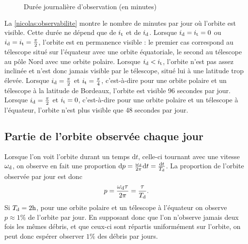 \begin{figure}
\scriptsize
\begin{center}
\def\svgwidth{0.5\linewidth}
 
 \vspace*{-2em}
\caption{Durée journalière d'observation (en minutes)} \label{nicolas:observabilite}
\end{center}
\end{figure}%

La \autoref{nicolas:observabilite} montre le nombre de minutes par jour où l'orbite est visible. Cette durée ne dépend que de $i_\text{t}$ et de $i_\text{d}$. Lorsque $i_\text{d}=i_\text{t}=0$ ou $i_\text{d}=i_\text{t}=\frac{\pi}{2}$, l'orbite est en permanence visible : le premier cas correspond au télescope situé sur l'équateur avec une orbite équatoriale, le second au télescope au pôle Nord avec une orbite polaire. Lorsque $i_\text{d} < i_\text{t}$, l'orbite n'est pas assez inclinée et n'est donc jamais visible par le télescope, situé lui à une latitude trop élevée. Lorsque $i_\text{d} = \frac{\pi}{2}$ et $i_\text{t} = \frac{\pi}{4}$, c'est-à-dire pour une orbite polaire et un télescope à la latitude de Bordeaux, l'orbite est visible 96 secondes par jour. Lorsque $i_\text{d} = \frac{\pi}{2}$ et $i_\text{t} = 0$, c'est-à-dire pour une orbite polaire et un télescope à l'équateur, l'orbite n'est plus visible que 48 secondes par jour. 


\subsection{Partie de l'orbite observée chaque jour}

Lorsque l'on voit l'orbite durant un temps $\mathrm{d}t$, celle-ci tournant avec une vitesse $\omega_\text{d}$, on observe en fait une proportion $\mathrm{d}p = \frac{\omega_\text{d}}{2\pi} \mathrm{d} t = \frac{\mathrm{d}t}{T_\text{d}}$. La proportion de l'orbite observée par jour est donc
\[ p = \frac{\omega_\text{d} \tau}{2\pi} = \frac{\tau}{T_\text{d}}.\]
Si $T_\text{d} = 2 \text{h}$, pour une orbite polaire et un télescope à l'équateur on observe $p \approx 1 \%$ de l'orbite par jour. En supposant donc que l'on n'observe jamais deux fois les mêmes débris, et que ceux-ci sont répartis uniformément  sur l'orbite, on peut donc espérer observer $1 \%$ des débris par jours.


